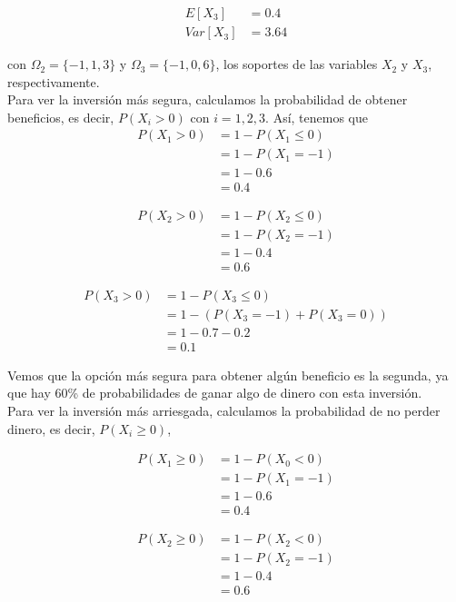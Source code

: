 \documentclass[12pt,a4paper,twoside,openright,titlepage,final]{article}
\begin{document}
\begin{align*}
E[X_3] & = 0.4 \\
Var[X_3] & = 3.64
\end{align*}

con $\Omega_2 = \{-1, 1, 3\}$ y $\Omega_3 = \{-1, 0, 6\}$, los soportes de las variables $X_2$ y $X_3$, respectivamente.\\

Para ver la inversión más segura, calculamos la probabilidad de obtener beneficios, es decir, $P(X_i > 0)$ con $i = 1,2,3$. Así, tenemos que\\

\begin{align*}
P(X_1 > 0) & = 1 - P(X_1 \leq 0) \\ & = 1 - P(X_1 = -1) \\ & = 1 - 0.6 \\ & = 0.4
\end{align*}

\begin{align*}
P(X_2 > 0) & = 1 - P(X_2 \leq 0) \\ & = 1 - P(X_2 = -1) \\ & = 1 - 0.4 \\ & = 0.6
\end{align*}

\begin{align*}
P(X_3 > 0) & = 1 - P(X_3 \leq 0) \\ & = 1 - (P(X_3 = -1) + P(X_3 = 0)) \\ & = 1 - 0.7 - 0.2 \\ & = 0.1
\end{align*}

Vemos que la opción más segura para obtener algún beneficio es la segunda, ya que hay 60\% de probabilidades de ganar algo de dinero con esta inversión.\\

Para ver la inversión más arriesgada, calculamos la probabilidad de no perder dinero, es decir, $P(X_i \geq 0)$,

\begin{align*}
P(X_1 \geq 0) & = 1 - P(X_0 < 0) \\ & = 1 - P(X_1 = -1) \\ & = 1 - 0.6 \\ & = 0.4
\end{align*}

\begin{align*}
P(X_2 \geq 0) & = 1 - P(X_2 < 0) \\ & = 1 - P(X_2 = -1) \\ & = 1 - 0.4 \\ & = 0.6
\end{align*}
\end{document}
